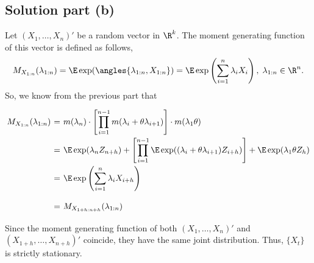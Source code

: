 \subsection*{Solution part (b)}

Let $(X_{1},\ldots, X_{n})'$ be a random vector in $\R^{k}$. The moment generating function of this vector is defined as follows, 
\[ M_{X_{1:n}}(\lambda_{1:n}) = \E \exp(\angles{\lambda_{1:n},X_{1:n}}) = \E \exp\left( \sum_{i = 1}^{n} \lambda_i X_i \right),\; \lambda_{1:n} \in \R^n. \]
So, we know from the previous part that
\[ \everymath{\displaystyle}
\arraycolsep=1.8pt\def\arraystretch{2.5}
\begin{array}{rcl}
    M_{X_{1:n}}(\lambda_{1:n})& = & m(\lambda_n) \cdot \left[ \prod_{i = 1}^{n-1} m(\lambda_i + \theta \lambda_{i+1}) \right] \cdot m(\lambda_1 \theta)\\
    & = & \E\exp(\lambda_n Z_{n+h}) + \left[ \prod_{i = 1}^{n-1} \E \exp((\lambda_i + \theta \lambda_{i+1}) Z_{i+h}) \right] + \E\exp(\lambda_1 \theta Z_{h})\\
    & = & \E \exp\left( \sum_{i = 1}^{n} \lambda_i X_{i+h} \right)\\
    & = & M_{X_{1+h:n+h}}(\lambda_{1:n})
\end{array} \]
Since the moment generating function of both $(X_{1},\ldots, X_{n})'$ and $(X_{1+h},\ldots, X_{n+h})'$ coincide, they have the same joint distribution. Thus, $\{X_t\}$ is strictly stationary.